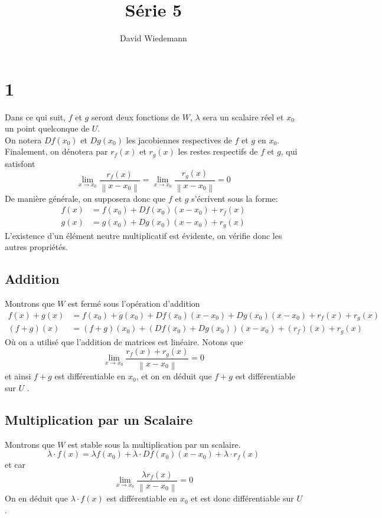 \documentclass[11pt, a4paper]{article}
\newcommand\N[1]{\left\lVert#1\right\rVert}
\begin{document}
\title{Série 5}
\author{David Wiedemann	}
\maketitle
\section*{1}
Dans ce qui suit, $f$ et $g$ seront deux fonctions de $W$, $\lambda$ sera un scalaire réel et $x_0$ un point quelconque de $U$.\\
On notera $Df( x_0) $ et $Dg( x_0) $ les jacobiennes respectives de $f$ et $g$ en $x_{0}$.\\
Finalement, on dénotera par $r_f( x) $ et $r_g( x) $ les restes respectifs de $f$ et $g$, qui satisfont
\[ 
	\lim_{x \to x_0} \frac{r_f( x) }{\N{x-x_0}} = 	\lim_{x \to x_0} \frac{r_g( x) }{\N{x-x_0}} = 0
\]
De manière générale, on supposera donc que $f$ et $g$ s'écrivent sous la forme:
\begin{align*}
	f( x) &= f( x_0) + Df( x_0) ( x-x_0)  + r_f( x) \\
	g( x) &= g( x_0)  + Dg( x_0) ( x-x_0)  + r_g( x) 
\end{align*}
L'existence d'un élément neutre multiplicatif est évidente, on vérifie donc les autres propriétés.
\subsection*{Addition}
Montrons que  $W$ est fermé sous l'opération d'addition
\begin{align*}
	f( x) + g( x) &= f( x_0) + g( x_0) + Df( x_0) ( x-x_0) + Dg( x_0) ( x-x_0) + r_f( x)  + r_g( x) \\
	( f+g) ( x) &= ( f+g) ( x_0)  + ( Df( x_0) + Dg( x_0) ) ( x-x_0)  + ( r_f) ( x) + r_g(x ) 
\end{align*}
Où on a utilisé que l'addition de matrices est linéaire.
Notons que
\[ 
	\lim_{x \to x_0} \frac{r_f( x) + r_g( x) }{\N{x-x_0}} = 0
\]
et ainsi $f+g$ est différentiable en $x_0$, et on en déduit que $f+g$ est différentiable sur $U$ .\\
\subsection*{Multiplication par un Scalaire}
Montrons que $W$ est stable sous la multiplication par un scalaire.
\[ 
	\lambda \cdot f( x) = \lambda f( x_0)  + \lambda \cdot Df( x_0) ( x-x_0)  + \lambda \cdot r_f( x) 
\]
et car
\[ 
	\lim_{x \to x_0} \frac{\lambda r_f( x) }{\N{x-x_0}} = 0
\]
On en déduit que $\lambda \cdot f( x) $ est différentiable en $x_0$ et est donc différentiable sur $U$.\\
\end{document}
